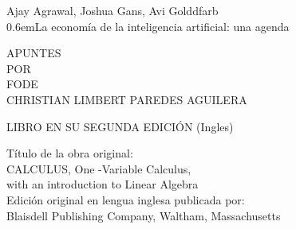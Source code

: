 \begin{titlingpage}

\newcommand\nbvspace[1][3]{\vspace*{\stretch{#1}}}
\newcommand\nbstretchyspace{\spaceskip0.5em plus 0.25em minus 0.25em}
\newcommand{\nbtitlestretch}{\spaceskip0.6em}
\pagestyle{empty}

\begin{center}
\bfseries
\nbvspace[1]

\Large Ajay Agrawal, Joshua Gans, Avi Golddfarb\\
\Huge
{\nbtitlestretch\Huge La economía de la inteligencia artificial: una agenda}\\
\vspace{.5cm}
\large

\nbvspace[1]

APUNTES\\

\nbvspace[1]
\small POR\\
\Large FODE\\[0.5em]
\footnotesize CHRISTIAN LIMBERT PAREDES AGUILERA\\

\nbvspace[2]

\begin{center}
\end{center}

\nbvspace[3]
\normalsize

LIBRO EN SU SEGUNDA EDICIÓN (Ingles)\\
\large
\nbvspace[1]

\end{center}

\break
\bfseries 

\nbvspace[1]
Título de la obra original:\\
CALCULUS, One -Variable Calculus,\\
with an introduction to Linear Algebra\\
Edición original en lengua inglesa publicada por:\\
Blaisdell Publishing Company, Waltham, Massachusetts\\


\end{titlingpage}
